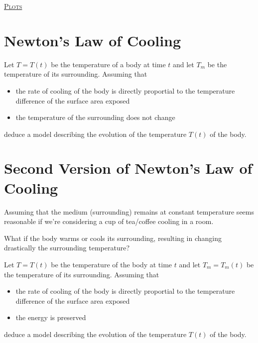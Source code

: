 \documentclass[12pt,a4paper]{article}
\newcounter{example}[section]
\begin{document}
\underline{\textsc{Plots}}

\newpage

\section{Newton's Law of Cooling}

\begin{example}
Let $T = T(t)$ be the temperature of a body at time $t$ and let $T_m$ be the temperature of its surrounding. Assuming that
	\begin{itemize}
	\item the rate of cooling of the body is directly proportial to the temperature difference of the surface area exposed
	\item the temperature of the surrounding does not change
	\end{itemize}
deduce a model describing the evolution of the temperature $T(t)$ of the body.
\end{example}

\newpage

\section{Second Version of Newton's Law of Cooling}
Assuming that the medium (surrounding) remains at constant temperature seems reasonable if we're considering a cup of tea/coffee cooling in a room.

What if the body warms or cools its surrounding, resulting in changing drastically the surrounding temperature?

\vspace*{12pt}

\begin{example}
Let $T = T(t)$ be the temperature of the body at time $t$ and let $T_m = T_m (t)$ be the temperature of its surrounding. Assuming that
	\begin{itemize}
	\item the rate of cooling of the body is directly proportial to the temperature difference of the surface area exposed
	\item the energy is preserved
	\end{itemize}
deduce a model describing the evolution of the temperature $T(t)$ of the body.
\end{example}

\newpage

\phantom{2}
\end{document}
